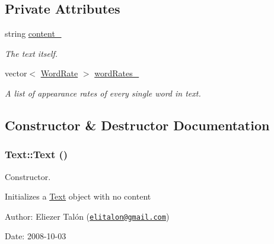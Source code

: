 \subsection*{Private Attributes}
\begin{CompactItemize}
\item 
\hypertarget{class_text_6db21a43e3b2d0795efad5be93bbea90}{
string \hyperlink{class_text_6db21a43e3b2d0795efad5be93bbea90}{content\_\-}}
\label{class_text_6db21a43e3b2d0795efad5be93bbea90}

\begin{CompactList}\small\item\em The text itself. \item\end{CompactList}\item 
\hypertarget{class_text_7517ff1f470d275d3013857f98ceb6ef}{
vector$<$ \hyperlink{_word_rate_8h_e8f43926daba5798edbb3cb94ad07ff7}{WordRate} $>$ \hyperlink{class_text_7517ff1f470d275d3013857f98ceb6ef}{wordRates\_\-}}
\label{class_text_7517ff1f470d275d3013857f98ceb6ef}

\begin{CompactList}\small\item\em A list of appearance rates of every single word in text. \item\end{CompactList}\end{CompactItemize}


\subsection{Constructor \& Destructor Documentation}
\hypertarget{class_text_b3e26143fccc52699bcc5149cae852bc}{
\subsubsection[Text]{\setlength{\rightskip}{0pt plus 5cm}Text::Text ()}}
\label{class_text_b3e26143fccc52699bcc5149cae852bc}


Constructor. 

Initializes a \hyperlink{class_text}{Text} object with no content

\begin{Desc}
\item[Author:]Eliezer Talón (\href{mailto:elitalon@gmail.com}{\tt elitalon@gmail.com}) \end{Desc}
\begin{Desc}
\item[Date:]2008-10-03 \end{Desc}


